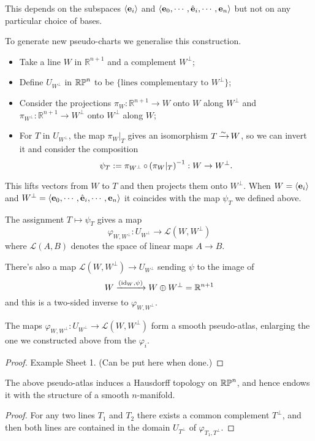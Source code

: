 \documentclass[a4paper,11pt]{article}
\begin{document}
	This depends on the subspaces $\expval{\vb e_i}$ and $\expval{\vb e_0, \cdots, \hat{\vb e}_i, \cdots, \vb e_n}$ but not on any particular choice of bases.

	To generate new pseudo-charts we generalise this construction.
	\begin{itemize}
		\item Take a line $W$ in $\mathbb{R}^{n+1}$ and a complement $W^\perp$;
		\item Define $U_{W^\perp}$ in $\mathbb{RP}^{n}$ to be $\{\text{lines complementary to }W^\perp\}$;
		\item Consider the projections $\pi_W : \mathbb{R}^{n+1} \to W$ onto $W$ along $W^\perp$ and $\pi_{W^\perp}: \mathbb{R}^{n+1}\to W^\perp$ onto $W^\perp$ along $W$;
		\item For $T$ in $U_{W^\perp}$, the map $\pi_W |_T$ gives an isomorphism $T \operatorname{\xrightarrow{\sim}} W$, so we can invert it and consider the composition \[
			\psi_T := \pi_{W^\perp} \operatorname{\circ} \left( \pi_W|_T \right)^{-1} : W \to W^\perp.
		\]
	\end{itemize}

	This lifts vectors from $W$ to $T$ and then projects them onto $W^\perp$. When $W = \expval{\vb e_i}$ and $W^\perp = \expval{\vb e_0, \cdots , \hat{\vb e}_i, \cdots, \vb e_n}$ it coincides with the map $\psi_T$ we defined above.
	
	The assignment $T \mapsto \psi_T$ gives a map
	\[
		\varphi_{W,W^\perp} : U_{W^\perp} \to \mathcal{L}(W, W^\perp)
	\]
	where $\mathcal{L}(A,B)$ denotes the space of linear maps $A \to B$.

	There's also a map $\mathcal{L}(W,W^\perp) \to U_{W^\perp}$ sending $\psi$ to the image of
	\[
		W \xrightarrow{(\operatorname{id}_W, \psi)} W \oplus W^\perp = \mathbb{R}^{n+1}
	\]
	and this is a two-sided inverse to $\varphi_{W,W^\perp}$.
	
	\begin{lem}
		The maps $\varphi_{W,W^\perp} : U_{W^\perp} \to \mathcal{L}(W,W^\perp)$ form a smooth pseudo-atlas, enlarging the one we constructed above from the $\varphi_i$.
	\end{lem}
	\begin{proof}
		Example Sheet 1. (Can be put here when done.)
	\end{proof}

	\begin{prop}
		The above pseudo-atlas induces a Hausdorff topology on $\mathbb{RP}^{n}$, and hence endows it with the structure of a smooth $n$-manifold.
	\end{prop}
	\begin{proof}
		For any two lines $T_1$ and $T_2$ there exists a common complement $T^\perp$, and then both lines are contained in the domain $U_{T^\perp}$ of $\varphi_{T_1, T^\perp}$.
	\end{proof}
\end{document}

